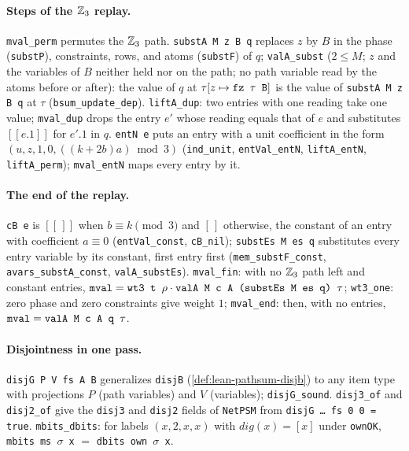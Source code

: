 \paragraph{Steps of the $\mathbb{Z}_{3}$ replay.}
\textnormal{\texttt{mval\_perm}} permutes the $\mathbb{Z}_{3}$ path. \textnormal{\texttt{substA M z B q}} replaces $z$ by $B$ in the phase
(\textnormal{\texttt{substP}}), constraints, rows, and atoms (\textnormal{\texttt{substF}}) of $q$; \textnormal{\texttt{valA\_subst}} ($2\le M$; $z$
and the variables of $B$ neither held nor on the path; no path variable read by the atoms before or
after): the value of $q$ at $\tau[z\mapsto\textnormal{\texttt{fz \ensuremath{\tau} B}}]$ is the value of \textnormal{\texttt{substA M z B q}} at $\tau$
(\textnormal{\texttt{bsum\_update\_dep}}). \textnormal{\texttt{liftA\_dup}}: two entries with one reading take one value;
\textnormal{\texttt{mval\_dup}} drops the entry $e'$ whose reading equals that of $e$ and substitutes $[[e.1]]$ for
$e'.1$ in $q$. \textnormal{\texttt{entN e}} puts an entry with a unit coefficient in the form
$(u,z,1,0,((k+2b)a)\bmod 3)$ (\textnormal{\texttt{ind\_unit}}, \textnormal{\texttt{entVal\_entN}}, \textnormal{\texttt{liftA\_entN}},
\textnormal{\texttt{liftA\_perm}}); \textnormal{\texttt{mval\_entN}} maps every entry by it.

\paragraph{The end of the replay.} \textnormal{\texttt{cB e}} is $[[\,]]$ when $b\equiv k\pmod 3$ and $[\,]$ otherwise, the
constant of an entry with coefficient $a\equiv0$ (\textnormal{\texttt{entVal\_const}}, \textnormal{\texttt{cB\_nil}});
\textnormal{\texttt{substEs M es q}} substitutes every entry variable by its constant, first entry first
(\textnormal{\texttt{mem\_substF\_const}}, \textnormal{\texttt{avars\_substA\_const}}, \textnormal{\texttt{valA\_substEs}}).
\textnormal{\texttt{mval\_fin}}: with no $\mathbb{Z}_{3}$ path left and constant entries,
$\textnormal{\texttt{mval}} = \textnormal{\texttt{wt3 t \ensuremath{\rho}}}\cdot\textnormal{\texttt{valA M c A (substEs M es q) \ensuremath{\tau}}}$; \textnormal{\texttt{wt3\_one}}: zero phase and
zero constraints give weight $1$; \textnormal{\texttt{mval\_end}}: then, with no entries, $\textnormal{\texttt{mval}} = \textnormal{\texttt{valA M c A q \ensuremath{\tau}}}$.

\paragraph{Disjointness in one pass.} \textnormal{\texttt{disjG P V fs A B}} generalizes \textnormal{\texttt{disjB}}
(\cref{def:lean-pathsum-disjb}) to any item type with projections $P$ (path variables) and $V$
(variables); \textnormal{\texttt{disjG\_sound}}. \textnormal{\texttt{disj3\_of}} and \textnormal{\texttt{disj2\_of}} give the \textnormal{\texttt{disj3}} and
\textnormal{\texttt{disj2}} fields of \textnormal{\texttt{NetPSM}} from \textnormal{\texttt{disjG \ldots{} fs 0 0 = true}}. \textnormal{\texttt{mbits\_dbits}}: for
labels $(x,2,x,x)$ with $\mathit{dig}(x)=[x]$ under \textnormal{\texttt{ownOK}}, \textnormal{\texttt{mbits ms \ensuremath{\sigma} x}} $=$
\textnormal{\texttt{dbits own \ensuremath{\sigma} x}}.

